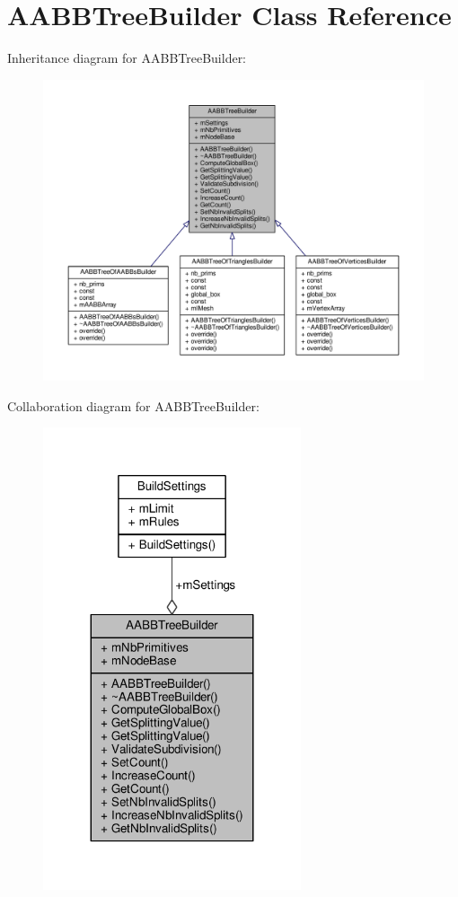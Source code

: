\hypertarget{classAABBTreeBuilder}{}\section{A\+A\+B\+B\+Tree\+Builder Class Reference}
\label{classAABBTreeBuilder}


Inheritance diagram for A\+A\+B\+B\+Tree\+Builder\+:
\nopagebreak
\begin{figure}[H]
\begin{center}
\leavevmode
\includegraphics[width=350pt]{da/de1/classAABBTreeBuilder__inherit__graph}
\end{center}
\end{figure}


Collaboration diagram for A\+A\+B\+B\+Tree\+Builder\+:
\nopagebreak
\begin{figure}[H]
\begin{center}
\leavevmode
\includegraphics[width=215pt]{de/d7d/classAABBTreeBuilder__coll__graph}
\end{center}
\end{figure}
